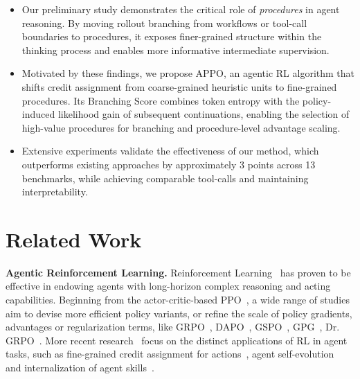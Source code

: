 \documentclass{llmxive}
\begin{document}
\vspace{-0.2cm}
\begin{itemize}[leftmargin=*] 
    \item Our preliminary study demonstrates the critical role of \textit{procedures} in agent reasoning. By moving rollout branching from workflows or tool-call boundaries to procedures, it exposes finer-grained structure within the thinking process and enables more informative intermediate supervision.
    \vspace{-0.1cm}
    \item Motivated by these findings, we propose APPO, an agentic RL algorithm that shifts credit assignment from coarse-grained heuristic units to fine-grained procedures. Its Branching Score combines token entropy with the policy-induced likelihood gain of subsequent continuations, enabling the selection of high-value procedures for branching and procedure-level advantage scaling.
    
    \item Extensive experiments validate the effectiveness of our method, which outperforms existing approaches by approximately 3 points across 13 benchmarks, while achieving comparable tool-calls and maintaining interpretability.
\end{itemize}

\section{Related Work}
\noindent\textbf{Agentic Reinforcement Learning.} Reinforcement Learning~\cite{kaufmann2023survey,schulman2017proximal,rafailov2023direct,guo2025deepseek} has proven to be effective in endowing agents with long-horizon complex reasoning and acting capabilities.  Beginning from the actor-critic-based PPO~\cite{schulman2017proximal}, a wide range of studies aim to devise more efficient policy variants, or refine the scale of policy gradients, advantages or regularization terms, like GRPO~\cite{guo2025deepseek}, DAPO~\cite{yu2025dapo}, GSPO~\cite{zheng2025group}, GPG~\cite{chu2026gpg}, Dr. GRPO~\cite{liu2025understanding}. More recent research~\cite{feng2025group,zhai2025agentevolver,lu2026skill0}  focus on the distinct applications of RL in agent tasks, such as fine-grained credit assignment for actions~\cite{feng2025group,dong2025agentic,dong2025agentic1}, agent self-evolution~\cite{wu2025evolver,zhai2025agentevolver,xia2026skillrl} and internalization of agent skills~\cite{lu2026skill0,zhang2026memskill}.
\end{document}
